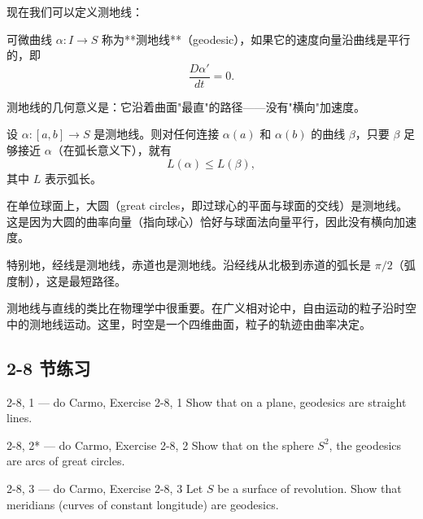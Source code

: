 现在我们可以定义测地线：

\begin{Definition}[测地线]\label{def:geodesic}
可微曲线 $\alpha: I \to S$ 称为**测地线**（geodesic），如果它的速度向量沿曲线是平行的，即
\[
\frac{D\alpha'}{dt} = 0.
\]
\end{Definition}

测地线的几何意义是：它沿着曲面"最直"的路径——没有"横向"加速度。

\begin{Proposition}[测地线是局部最短]\label{prop:geodesic-local-minimal}
设 $\alpha: [a,b] \to S$ 是测地线。则对任何连接 $\alpha(a)$ 和 $\alpha(b)$ 的曲线 $\beta$，只要 $\beta$ 足够接近 $\alpha$（在弧长意义下），就有
\[
L(\alpha) \leq L(\beta),
\]
其中 $L$ 表示弧长。
\end{Proposition}

\begin{Example}[球面上的测地线]\label{ex:sphere-geodesic}
在单位球面上，大圆（great circles，即过球心的平面与球面的交线）是测地线。这是因为大圆的曲率向量（指向球心）恰好与球面法向量平行，因此没有横向加速度。

特别地，经线是测地线，赤道也是测地线。沿经线从北极到赤道的弧长是 $\pi/2$（弧度制），这是最短路径。
\end{Example}

\begin{Remark}
测地线与直线的类比在物理学中很重要。在广义相对论中，自由运动的粒子沿时空中的测地线运动。这里，时空是一个四维曲面，粒子的轨迹由曲率决定。
\end{Remark}

\subsection*{2-8 节练习}

\begin{exercise}{2-8, 1 — do Carmo, Exercise 2-8, 1}
Show that on a plane, geodesics are straight lines.
\end{exercise}

\begin{exercise}{2-8, 2* — do Carmo, Exercise 2-8, 2}
Show that on the sphere $S^2$, the geodesics are arcs of great circles.
\end{exercise}

\begin{exercise}{2-8, 3 — do Carmo, Exercise 2-8, 3}
Let $S$ be a surface of revolution. Show that meridians (curves of constant longitude) are geodesics.
\end{exercise}


